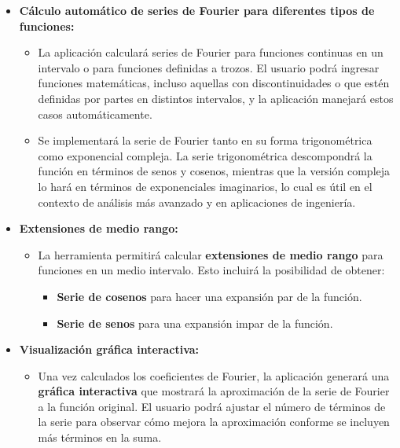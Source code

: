 \begin{itemize}
	\item \textbf{Cálculo automático de series de Fourier para diferentes tipos de funciones:}
	\vspace{-10pt}
	\begin{itemize}
		\item La aplicación calculará series de Fourier para funciones continuas en un intervalo o para funciones definidas a trozos. El usuario podrá ingresar funciones matemáticas, incluso aquellas con discontinuidades o que estén definidas por partes en distintos intervalos, y la aplicación manejará estos casos automáticamente.
		\item Se implementará la serie de Fourier tanto en su forma trigonométrica como  exponencial compleja. La serie trigonométrica descompondrá la función en términos de senos y cosenos, mientras que la versión compleja lo hará en términos de exponenciales imaginarios, lo cual es útil en el contexto de análisis más avanzado y en aplicaciones de ingeniería.
	\end{itemize}
	
	\item \textbf{Extensiones de medio rango:}
	\vspace{-10pt}
	\begin{itemize}
		\item La herramienta permitirá calcular \textbf{extensiones de medio rango} para funciones en un medio intervalo. Esto incluirá la posibilidad de obtener:
		\begin{itemize}
			\item \textbf{Serie de cosenos} para hacer una expansión par de la función.
			\item \textbf{Serie de senos} para una expansión impar de la función.
		\end{itemize}
	\end{itemize}
	
	\item \textbf{Visualización gráfica interactiva:}
	\vspace{-10pt}
	\begin{itemize}
		\item Una vez calculados los coeficientes de Fourier, la aplicación generará una \textbf{gráfica interactiva} que mostrará la aproximación de la serie de Fourier a la función original. El usuario podrá ajustar el número de términos de la serie para observar cómo mejora la aproximación conforme se incluyen más términos en la suma.
	\end{itemize}
	

\end{itemize}
